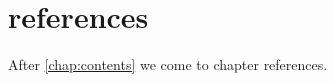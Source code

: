 \chapter{references}
\label{chap:refereces}

After \cref{chap:contents} we come to chapter references.






